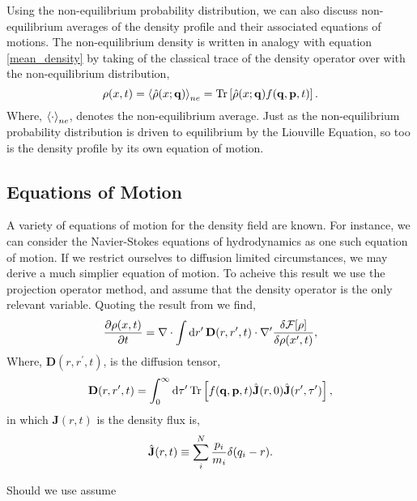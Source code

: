 Using the non-equilibrium probability distribution, we can also discuss
non-equilibrium averages of the density profile and their associated equations
of motions. The non-equilibrium density is written in analogy with equation
\ref{mean_density} by taking of the classical trace of the density operator
over with the non-equilibrium distribution,
%
\begin{equation}
    \rho(x, t) = \left\langle \hat{\rho}(x; \mathbf{q}) \right\rangle_{ne} =
        \mathrm{Tr}\left[ \hat{\rho}(x; \mathbf{q}) f(\mathbf{q}, \mathbf{p}, t) \right].
\end{equation}
%
Where, $\left\langle \cdot \right\rangle_{ne}$, denotes the non-equilibrium average. Just as the
non-equilibrium probability distribution is driven to equilibrium by the
Liouville Equation, so too is the density profile by its own equation of
motion.

\subsection{Equations of Motion} %

A variety of equations of motion for the density field are known.  For
instance, we can consider the Navier-Stokes equations of hydrodynamics as one
such equation of motion. If we restrict ourselves to diffusion limited
circumstances, we may derive a much simplier equation of motion. To acheive
this result we use the projection operator method, and assume that the 
density operator is the only relevant variable. Quoting the result from
\cite{ESPANOL09} we find,
%
\begin{equation}
    \label{eq:mean_eom}
    \frac{\partial \rho(x, t)}{\partial t} = 
        \nabla \cdot \int \mathrm{d}r^\prime\, \mathbf{D}(r, r^\prime, t) 
        \cdot \nabla^\prime \frac{\delta \mathcal{F}[\rho]}{\delta \rho(x^\prime, t)},
\end{equation}
%
Where, $\mathbf{D}(r, r^\prime, t)$, is the diffusion tensor,
%
\begin{equation}
    \mathbf{D}(r, r^\prime, t) = \int_0^\infty \mathrm{d}\tau^\prime\,
        \mathrm{Tr}\left[ f(\mathbf{q}, \mathbf{p}, t)\hat{\mathbf{J}}(r, 0)
        \hat{\mathbf{J}}(r^\prime, \tau^\prime) \right],
\end{equation}
%
in which $\mathbf{J}(r, t)$ is the density flux is,
%
\begin{equation}
    \hat{\mathbf{J}}(r, t) \equiv 
        \sum_i^N \frac{p_i}{m_i} \delta(q_i - r).
\end{equation}

Should we use assume 

